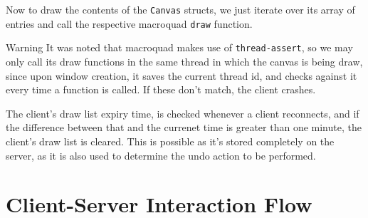 \documentclass{article}
\newcommand{\code}[1]{\texttt{#1}}
\begin{document}
Now to draw the contents of the \code{Canvas} structs, we just iterate over its
array of entries and call the respective macroquad \code{draw} function.

\begin{warningbox}{Warning} It was noted that macroquad makes use of
    \code{thread-assert}, so we may only call its draw functions in the same
    thread in which the canvas is being draw, since upon window creation, it
    saves the current thread id, and checks against it every time a function is
    called. If these don't match, the client crashes.
\end{warningbox}

The client's draw list expiry time, is checked whenever a client reconnects, and
if the difference between that and the currenet time is greater than one minute,
the client's draw list is cleared. This is possible as it's stored completely on
the server, as it is also used to determine the undo action to be performed.

\newpage

\appendix

\section{Client-Server Interaction Flow}

\vfill
\end{document}
